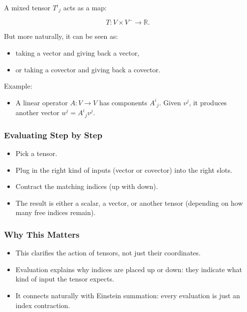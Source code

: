 \documentclass[
  letterpaper,
  DIV=11,
  numbers=noendperiod]{scrreprt}
\providecommand{\tightlist}{%
  \setlength{\itemsep}{0pt}\setlength{\parskip}{0pt}}
\begin{document}
A mixed tensor \(T^i{}_j\) acts as a map:

\[
T: V \times V^- \to \mathbb{R}.
\]

But more naturally, it can be seen as:

\begin{itemize}
\tightlist
\item
  taking a vector and giving back a vector,
\item
  or taking a covector and giving back a covector.
\end{itemize}

Example:

\begin{itemize}
\tightlist
\item
  A linear operator \(A: V \to V\) has components \(A^i{}_j\). Given
  \(v^j\), it produces another vector \(w^i = A^i{}_j v^j\).
\end{itemize}

\subsubsection{Evaluating Step by Step}\label{evaluating-step-by-step}

\begin{itemize}
\tightlist
\item
  Pick a tensor.
\item
  Plug in the right kind of inputs (vector or covector) into the right
  slots.
\item
  Contract the matching indices (up with down).
\item
  The result is either a scalar, a vector, or another tensor (depending
  on how many free indices remain).
\end{itemize}

\subsubsection{Why This Matters}\label{why-this-matters-5}

\begin{itemize}
\tightlist
\item
  This clarifies the action of tensors, not just their coordinates.
\item
  Evaluation explains why indices are placed up or down: they indicate
  what kind of input the tensor expects.
\item
  It connects naturally with Einstein summation: every evaluation is
  just an index contraction.
\end{itemize}
\end{document}
